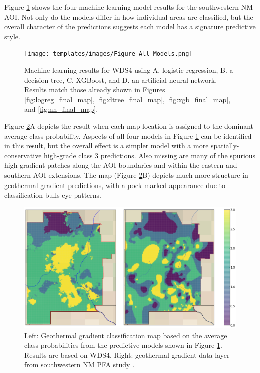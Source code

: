 Figure \ref{fig:combined_maps} shows the four machine learning model results for the southwestern NM AOI. Not only do the models differ in how individual areas are classified, but the overall character of the predictions suggests each model has a signature predictive style.

\begin{figure}[!htp]
\centering
\texttt{[image: templates/images/Figure-All\_Models.png]}
\caption[Combined machine learning results]{Machine learning results for WDS4 using A. logistic regression, B. a decision tree, C. XGBoost, and D. an artificial neural network. Results match those already shown in Figures \ref{fig:logreg_final_map}, \ref{fig:dtree_final_map}, \ref{fig:xgb_final_map}, and \ref{fig:nn_final_map}.}
\label{fig:combined_maps}
\end{figure}


Figure \ref{fig:avg_final_map}A depicts the result when each map location is assigned to the dominant average class probability. Aspects of all four models in Figure \ref{fig:combined_maps} can be identified in this result, but the overall effect is a simpler model with a more spatially-conservative high-grade class 3 predictions. Also missing are many of the spurious high-gradient patches along the AOI boundaries and within the eastern and southern AOI extensions. The \citeauthor{bielicki_hydrogeolgic_2015} map (Figure \ref{fig:avg_final_map}B) depicts much more structure in geothermal gradient predictions, with a pock-marked appearance due to classification bulls-eye patterns.

\begin{figure}[!htp]
\centering
\includegraphics[width=\textwidth]{templates/images/Figure-Average_Gradient_Map_Joint.png}
\caption[Probability-averaged prediction map]{Left: Geothermal gradient classification map based on the average class probabilities from the predictive models shown in Figure \ref{fig:combined_maps}. Results are based on WDS4. Right: geothermal gradient data layer from southwestern NM PFA study \protect\citep{bielicki_hydrogeolgic_2015}.}
\label{fig:avg_final_map}
\end{figure}

